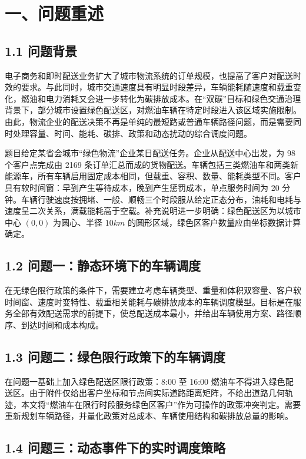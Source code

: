 \documentclass[UTF8,zihao=-4,a4paper]{ctexart}
\begin{document}
\section{一、问题重述}

\subsection{1.1 问题背景}

电子商务和即时配送业务扩大了城市物流系统的订单规模，也提高了客户对配送时效的要求。与此同时，城市交通速度具有明显时段差异，车辆能耗随速度和载重变化，燃油和电力消耗又会进一步转化为碳排放成本。在“双碳”目标和绿色交通治理背景下，部分城市设置绿色配送区，对燃油车辆在特定时段进入该区域实施限制。由此，物流企业的配送决策不再是单纯的最短路或普通车辆路径问题，而是需要同时处理容量、时间、能耗、碳排、政策和动态扰动的综合调度问题。

题目给定某省会城市“绿色物流”企业某日配送任务。企业从配送中心出发，为 98 个客户点完成由 2169 条订单汇总而成的货物配送。车辆包括三类燃油车和两类新能源车，所有车辆启用固定成本相同，但载重、容积、数量、能耗类型不同。客户具有软时间窗：早到产生等待成本，晚到产生惩罚成本，单点服务时间为 20 分钟。车辆行驶速度按拥堵、一般、顺畅三个时段服从给定正态分布，油耗和电耗与速度呈二次关系，满载能耗高于空载。补充说明进一步明确：绿色配送区为以城市中心 \((0,0)\) 为圆心、半径 \(10 km\) 的圆形区域，绿色区客户数量应由坐标数据计算确定。

\subsection{1.2 问题一：静态环境下的车辆调度}

在无绿色限行政策的条件下，需要建立考虑车辆类型、重量和体积双容量、客户软时间窗、速度时变特性、载重相关能耗与碳排放成本的车辆调度模型。目标是在服务全部有效配送需求的前提下，使总配送成本最小，并给出车辆使用方案、路径顺序、到达时间和成本构成。

\subsection{1.3 问题二：绿色限行政策下的车辆调度}

在问题一基础上加入绿色配送区限行政策：8:00 至 16:00 燃油车不得进入绿色配送区。由于附件仅给出客户坐标和节点间实际道路距离矩阵，不给出道路几何轨迹，本文将“燃油车在限行时段服务绿色区客户”作为可操作的政策冲突判定。需要重新规划车辆路径，并量化政策对总成本、车辆使用结构和碳排放总量的影响。

\subsection{1.4 问题三：动态事件下的实时调度策略}
\end{document}
